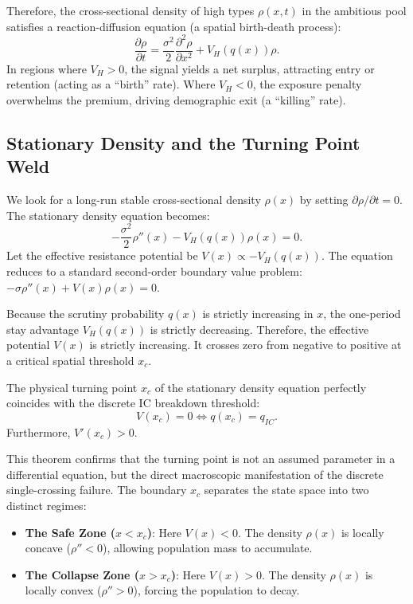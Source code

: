 Therefore, the cross-sectional density of high types $\rho(x, t)$ in the ambitious pool satisfies a reaction-diffusion equation (a spatial birth-death process):
\[
\frac{\partial \rho}{\partial t} = \frac{\sigma^2}{2} \frac{\partial^2 \rho}{\partial x^2} + V_H(q(x)) \rho.
\]
In regions where $V_H > 0$, the signal yields a net surplus, attracting entry or retention (acting as a ``birth'' rate). Where $V_H < 0$, the exposure penalty overwhelms the premium, driving demographic exit (a ``killing'' rate).

\subsection{Stationary Density and the Turning Point Weld}

We look for a long-run stable cross-sectional density $\rho(x)$ by setting $\partial \rho / \partial t = 0$. The stationary density equation becomes:
\begin{equation}
-\frac{\sigma^2}{2} \rho''(x) - V_H(q(x)) \rho(x) = 0.
\label{eq:stationary-density}
\end{equation}
Let the effective resistance potential be $V(x) \propto -V_H(q(x))$. The equation reduces to a standard second-order boundary value problem: $-\sigma \rho''(x) + V(x)\rho(x) = 0$. 

Because the scrutiny probability $q(x)$ is strictly increasing in $x$, the one-period stay advantage $V_H(q(x))$ is strictly decreasing. Therefore, the effective potential $V(x)$ is strictly increasing. It crosses zero from negative to positive at a critical spatial threshold $x_c$.

\begin{theorem}
The physical turning point $x_c$ of the stationary density equation perfectly coincides with the discrete IC breakdown threshold:
\[
V(x_c) = 0 \iff q(x_c) = q_{IC}.
\]
Furthermore, $V'(x_c) > 0$.
\end{theorem}
This theorem confirms that the turning point is not an assumed parameter in a differential equation, but the direct macroscopic manifestation of the discrete single-crossing failure. The boundary $x_c$ separates the state space into two distinct regimes:
\begin{itemize}
    \item \textbf{The Safe Zone ($x < x_c$)}: Here $V(x) < 0$. The density $\rho(x)$ is locally concave ($\rho'' < 0$), allowing population mass to accumulate.
    \item \textbf{The Collapse Zone ($x > x_c$)}: Here $V(x) > 0$. The density $\rho(x)$ is locally convex ($\rho'' > 0$), forcing the population to decay.
\end{itemize}

